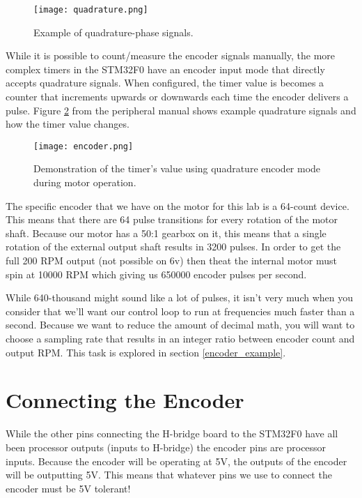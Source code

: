 \documentclass[openany,11pt,fleqn]{book} %
\begin{document}
\begin{figure}[tb]
    \centering\texttt{[image: quadrature.png]}
    \caption{Example of quadrature-phase signals.}
    \label{quadrature}
\end{figure}

\noindent While it is possible to count/measure the encoder signals manually, the more complex timers in the STM32F0 have an encoder input mode that directly accepts quadrature signals. When configured, the timer value is becomes a counter that increments upwards or downwards each time the encoder delivers a pulse. Figure \ref{encoder} from the peripheral manual shows example quadrature signals and how the timer value changes.

\begin{figure}[tb]
    \centering\texttt{[image: encoder.png]}
    \caption{Demonstration of the timer's value using quadrature encoder mode during motor operation. }
    \label{encoder}
\end{figure}

The specific encoder that we have on the motor for this lab is a 64-count device. This means that there are 64 pulse transitions for every rotation of the motor shaft. Because our motor has a 50:1 gearbox on it, this means that a single rotation of the external output shaft results in 3200 pulses. In order to get the full 200 RPM output (not possible on 6v) then theat the internal motor must spin at 10000 RPM which giving us 650000 encoder pulses per second. 

While 640-thousand might sound like a lot of pulses, it isn't very much when you consider that we'll want our control loop to run at frequencies much faster than a second. Because we want to reduce the amount of decimal math, you will want to choose a sampling rate that results in an integer ratio between encoder count and output RPM. This task is explored in section \ref{encoder_example}.

\section{Connecting the Encoder}
While the other pins connecting the H-bridge board to the STM32F0 have all been processor outputs (inputs to H-bridge) the encoder pins are processor inputs. Because the encoder will be operating at 5V, the outputs of the encoder will be outputting 5V. This means that whatever pins we use to connect the encoder must be 5V tolerant!
\end{document}
